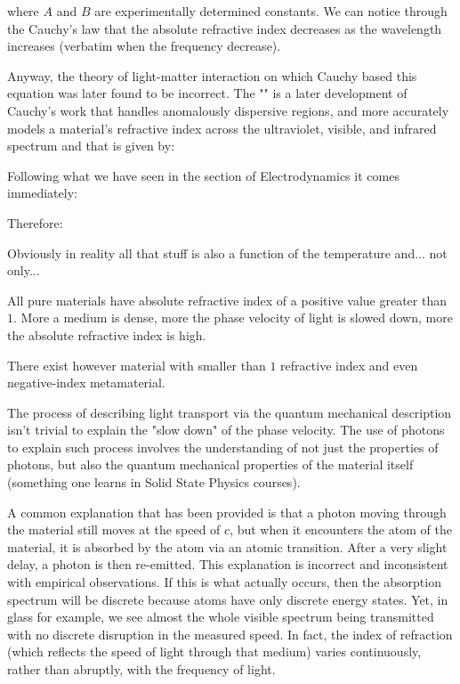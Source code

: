 	where $A$ and $B$ are experimentally determined constants. We can notice through the Cauchy's law that the absolute refractive index decreases as the wavelength increases (verbatim when the frequency decrease).
	
	Anyway, the theory of light-matter interaction on which Cauchy based this equation was later found to be incorrect. The  "" is a later development of Cauchy's work that handles anomalously dispersive regions, and more accurately models a material's refractive index across the ultraviolet, visible, and infrared spectrum and that is given by:
	
	Following what we have seen in the section of Electrodynamics it comes immediately:
	
	Therefore:
	
	\begin{tcolorbox}[title=Remark,colframe=black,arc=10pt]
	Obviously in reality all that stuff is also a function of the temperature and... not only...
	\end{tcolorbox}	
	All pure materials have absolute refractive index of a positive value greater than $1$. More a medium is dense, more the phase velocity of light is slowed down, more the absolute refractive index is high.
	\begin{tcolorbox}[title=Remark,colframe=black,arc=10pt]
	There exist however material with smaller than $1$ refractive index and even negative-index metamaterial.
	\end{tcolorbox}	
	The process of describing light transport via the quantum mechanical description isn't trivial to explain the "slow down" of the phase velocity. The use of photons to explain such process involves the understanding of not just the properties of photons, but also the quantum mechanical properties of the material itself (something one learns in Solid State Physics courses).

	A common explanation that has been provided is that a photon moving through the material still moves at the speed of $c$, but when it encounters the atom of the material, it is absorbed by the atom via an atomic transition. After a very slight delay, a photon is then re-emitted. This explanation is incorrect and inconsistent with empirical observations. If this is what actually occurs, then the absorption spectrum will be discrete because atoms have only discrete energy states. Yet, in glass for example, we see almost the whole visible spectrum being transmitted with no discrete disruption in the measured speed. In fact, the index of refraction (which reflects the speed of light through that medium) varies continuously, rather than abruptly, with the frequency of light.

